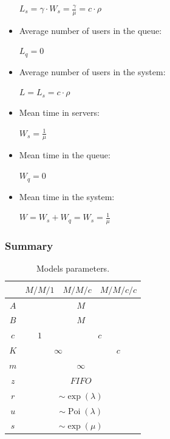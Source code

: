 \documentclass[../main.tex]{subfiles}
\begin{document}
\begin{itemize}
{		$
			L_s = \gamma \cdot W_s = \frac {\gamma} {\mu} = c \cdot \rho
		$
	}
	\item {
		Average number of users in the queue:

		$
			L_q = 0
		$
	}
	\item {
		Average number of users in the system:

		$
			L = L_s = c \cdot \rho
		$
	}
	\item {
		Mean time in servers:

		$
			W_s = \frac {1} {\mu}
		$
	}
	\item {
		Mean time in the queue:

		$
			W_q = 0
		$
	}
	\item {
		Mean time in the system:

		$
			W =
			W_s + W_q =
			W_s =
			\frac {1} {\mu}
		$
	}
\end{itemize}

\subsubsection{Summary}

\begin{table}[H]
	\centering
	\begin{tabular}{|c|c|c|c|}
		\hline
		& $M/M/1$ & $M/M/c$ & $M/M/c/c$ \\
		\hline
		$A$ & \multicolumn{3}{c|}{$M$} \\
		\hline
		$B$ & \multicolumn{3}{c|}{$M$} \\
		\hline
		$c$ & $1$ & \multicolumn{2}{c|}{$c$} \\
		\hline
		$K$ & \multicolumn{2}{c|}{$\infty$} & $c$ \\
		\hline
		$m$ & \multicolumn{3}{c|}{$\infty$} \\
		\hline
		$z$ & \multicolumn{3}{c|}{$FIFO$} \\
		\hline
		$r$ & \multicolumn{3}{c|}{$\sim \operatorname{exp} (\lambda)$} \\
		\hline
		$u$ & \multicolumn{3}{c|}{$\sim \operatorname{Poi} (\lambda)$} \\
		\hline
		$s$ & \multicolumn{3}{c|}{$\sim \operatorname{exp} (\mu)$} \\
		\hline
	\end{tabular}
	\caption{
		\label{tab:summary_models_1}
		Models parameters.
	}
\end{table}
\end{document}
